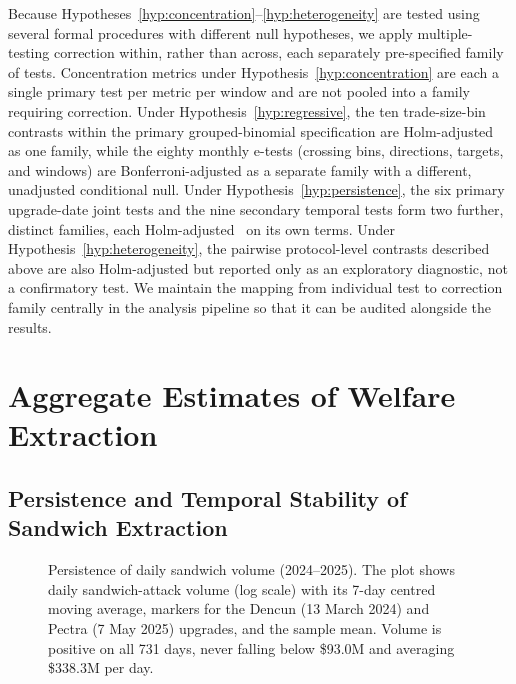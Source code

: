 \documentclass[pdflatex, sn-basic]{sn-jnl}
\theoremstyle{thmstylethree}%
\begin{document}
    Because Hypotheses~\ref{hyp:concentration}--\ref{hyp:heterogeneity} are tested using several formal procedures with different null hypotheses, we apply multiple-testing correction within, rather than across, each separately pre-specified family of tests.
    Concentration metrics under Hypothesis~\ref{hyp:concentration} are each a single primary test per metric per window and are not pooled into a family requiring correction.
    Under Hypothesis~\ref{hyp:regressive}, the ten trade-size-bin contrasts within the primary grouped-binomial specification are Holm-adjusted~\citep{Holm1979} as one family, while the eighty monthly e-tests (crossing bins, directions, targets, and windows) are Bonferroni-adjusted as a separate family with a different, unadjusted conditional null.
    Under Hypothesis~\ref{hyp:persistence}, the six primary upgrade-date joint tests and the nine secondary temporal tests form two further, distinct families, each Holm-adjusted~\citep{Holm1979} on its own terms.
    Under Hypothesis~\ref{hyp:heterogeneity}, the pairwise protocol-level contrasts described above are also Holm-adjusted but reported only as an exploratory diagnostic, not a confirmatory test.
    We maintain the mapping from individual test to correction family centrally in the analysis pipeline so that it can be audited alongside the results.
    
    \FloatBarrier


	\section{Aggregate Estimates of Welfare Extraction}
	\label{sec:aggregate-welfare}
    \subsection{Persistence and Temporal Stability of Sandwich Extraction}
    \label{subsec:persistence}

    \begin{figure}[htb]
		\centering
		
		\caption{Persistence of daily sandwich volume (2024--2025).
		The plot shows daily sandwich-attack volume (log scale) with its \num{7}-day centred moving average, markers for the Dencun (13 March 2024) and Pectra (7 May 2025) upgrades, and the sample mean.
		Volume is positive on all \num{731} days, never falling below \$\num{93.0}M and averaging \$\num{338.3}M per day.}
		\label{fig:temporal-stability}
	\end{figure}
\end{document}
